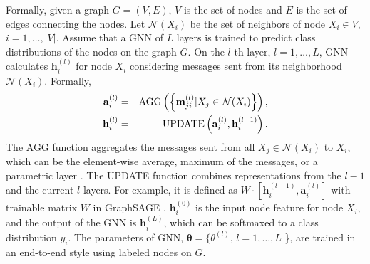 Formally, 
given a graph $G=(V, E)$, $V$ is the set of nodes and $E$ is the set of edges connecting the nodes. 
Let $\mathcal{N}(X_i)$ be the set of neighbors of node $X_i\in V$, $i=1,\dots, |V|$.
Assume that a GNN of $L$ layers is trained to predict class distributions of the nodes on the graph $G$.
On the $l$-th layer, $l=1,\dots, L$, 
GNN calculates $\mathbf{h}_i^{(l)}$ for node $X_i$ considering messages sent from its neighborhood $\mathcal{N}(X_i)$.
Formally,
\begin{eqnarray}
\mathbf{a}^{(l)}_i & = & \textnormal{AGG}\left(\left\{\mathbf{m}^{(l)}_{ji}|X_j \in \mathcal{N}(X_i)\right\}\right),\\
\mathbf{h}^{(l)}_i & = & \textnormal{UPDATE}\left(\mathbf{a}^{(l)}_i, \mathbf{h}^{(l-1)}_i \right).
\end{eqnarray}
The AGG function aggregates the messages sent from all $X_j\in \mathcal{N}(X_i)$ to $X_i$, which can be the element-wise average, maximum of the messages, or a parametric layer \cite{xu2018powerful}.
The UPDATE function combines representations from the $l-1$ and the current $l$ layers.
For example, it is defined as $W\cdot \left[ \mathbf{h}_i^{(l-1)}, \mathbf{a}_i^{(l)} \right]$ with trainable matrix $W$ in GraphSAGE \cite{hamilton2017inductive}.
$\mathbf{h}^{(0)}_i$ is the input node feature for node $X_i$, 
and the output of the GNN is $\mathbf{h}_i^{(L)}$, which can be softmaxed to a class distribution $y_i$.
The parameters of GNN, $\boldsymbol{\theta} = \{ \theta^{(l)}$, $l=1,\dots,L$ \},
are trained in an end-to-end style using labeled nodes on $G$.
